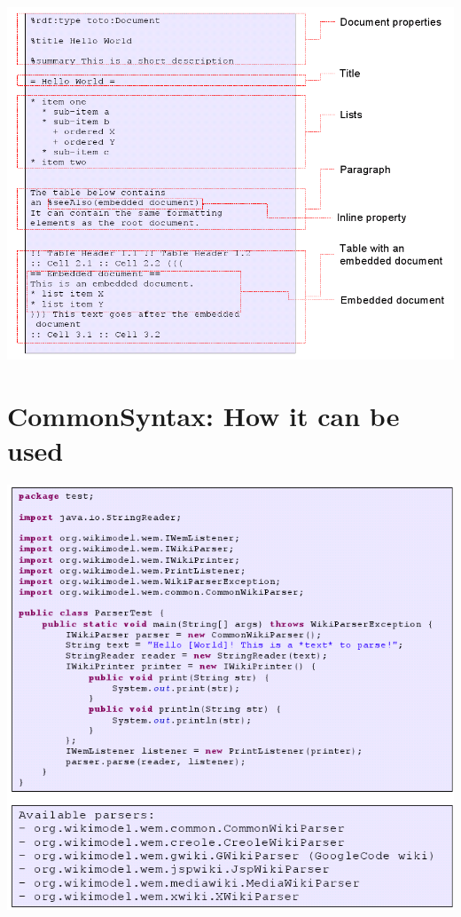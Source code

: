 \documentclass{article}
\begin{document}
\includegraphics[bb=0 0 300 236]{CommonSyntaxExample1.png}


\section{CommonSyntax: How it can be used}

\includegraphics[bb=0 0 300 285]{CommonSyntaxExample2.png}
\end{document}
